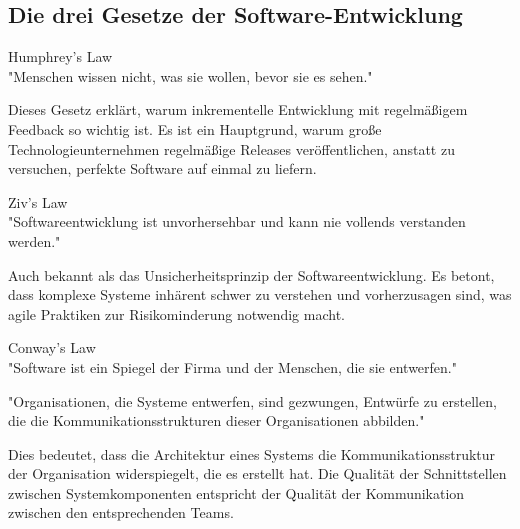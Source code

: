 \subsection{Die drei Gesetze der Software-Entwicklung}

\begin{concept}{Humphrey's Law}\\
    "Menschen wissen nicht, was sie wollen, bevor sie es sehen."
    
    Dieses Gesetz erklärt, warum inkrementelle Entwicklung mit regelmäßigem Feedback so wichtig ist. Es ist ein Hauptgrund, warum große Technologieunternehmen regelmäßige Releases veröffentlichen, anstatt zu versuchen, perfekte Software auf einmal zu liefern.
\end{concept}

\begin{concept}{Ziv's Law}\\
    "Softwareentwicklung ist unvorhersehbar und kann nie vollends verstanden werden."
    
    Auch bekannt als das Unsicherheitsprinzip der Softwareentwicklung. Es betont, dass komplexe Systeme inhärent schwer zu verstehen und vorherzusagen sind, was agile Praktiken zur Risikominderung notwendig macht.
\end{concept}

\begin{concept}{Conway's Law}\\
    "Software ist ein Spiegel der Firma und der Menschen, die sie entwerfen."
    
    "Organisationen, die Systeme entwerfen, sind gezwungen, Entwürfe zu erstellen, die die Kommunikationsstrukturen dieser Organisationen abbilden."
    
    Dies bedeutet, dass die Architektur eines Systems die Kommunikationsstruktur der Organisation widerspiegelt, die es erstellt hat. Die Qualität der Schnittstellen zwischen Systemkomponenten entspricht der Qualität der Kommunikation zwischen den entsprechenden Teams.
\end{concept}